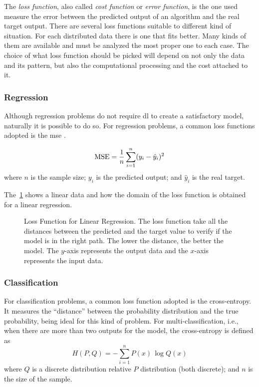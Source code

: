 The \emph{loss function}, also called \emph{cost function} or \emph{error function}, is the one used measure the error between the predicted output of an algorithm and the real target output. 
There are several loss functions suitable to different kind of situation. 
For each distributed data there is one that fits better.
Many kinds of them are available and must be analyzed the most proper one to each case. 
The choice of what loss function should be picked will depend on not only the data and its pattern, but also the computational processing and the cost attached to it.

\subsubsection*{Regression}

Although regression problems do not require \gls*{dl} to create a satisfactory model, naturally it is possible to do so.
For regression problems, a common loss functions adopted is the \gls*{mse} \citep{bussab2017}. 

\begin{equation}
    \text{MSE} = \frac{1}{n} \sum_{i=1}^n (y_i - \hat{y}_i)^2
    \label{eq:mse}
\end{equation}
%
where \(n\) is the sample size; \(y_i\) is the predicted output; and \(\hat{y}_i\) is the real target.

The~\cref{fig:mae_chart} shows a linear data and how the domain of the loss function is obtained for a linear regression.
%
\begin{figure}[!htb]
    \centering
    
    \caption[Loss Function for Linear Regression]{Loss Function for Linear Regression. The loss function take all the distances between the predicted and the target value to verify if the model is in the right path. The lower the distance, the better the model. The \(y\)-axis represents the output data and the \(x\)-axis represents the input data.}
    \label{fig:mae_chart}
\end{figure}

\subsubsection*{Classification}

For classification problems, a common loss function adopted is the cross-entropy.
It measures the ``distance'' between the probability distribution and the true probability, being ideal for this kind of problem.
For multi-classification, i.e., when there are more than two outputs for the model, the cross-entropy is defined as
%
\begin{equation}
    H(P,Q) = - \sum_{i=1}^n P(x) \, \log Q(x)
    \label{eq:cross_entropy}
\end{equation}
%
where \(Q\) is a discrete distribution relative \(P\) distribution (both discrete); and \(n\) is the size of the sample.

